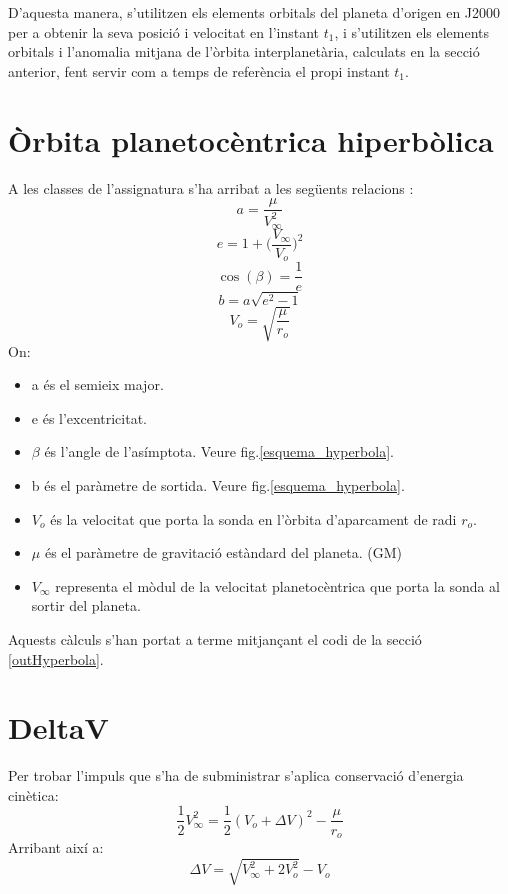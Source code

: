 D'aquesta manera, s'utilitzen els elements orbitals del planeta d'origen en J2000 per a obtenir la seva posició i velocitat en l'instant $t_1$, i s'utilitzen els elements orbitals i l'anomalia mitjana de l'òrbita interplanetària, calculats en la secció anterior, fent servir com a temps de referència el propi instant $t_1$.

\section{Òrbita planetocèntrica hiperbòlica}
A les classes de l'assignatura s'ha arribat a les següents relacions \cite{Calaf2017d}:
\begin{equation}
a = \frac{\mu}{V_{\infty}^{2}}
\end{equation}
\begin{equation}
e = 1 + \Big(\frac{V_{\infty}}{V_{o}}\Big)^2
\end{equation}
\begin{equation}
\cos(\beta) = \frac{1}{e}
\end{equation}
\begin{equation}
b = a\sqrt{e^2-1}
\end{equation}
\begin{equation}
V_o = \sqrt{\frac{\mu}{r_o}}
\end{equation}
On:
\begin{itemize}
	\item a és el semieix major.
	\item e és l'excentricitat.
	\item $\beta$ és l'angle de l'asímptota. Veure fig.\ref{esquema_hyperbola}.
	\item b és el paràmetre de sortida. Veure fig.\ref{esquema_hyperbola}.
	\item $V_o$ és la velocitat que porta la sonda en l'òrbita d'aparcament de radi $r_o$.
	\item $\mu$ és el paràmetre de gravitació estàndard del planeta. (GM)
	\item $V_{\infty}$ representa el mòdul de la velocitat planetocèntrica que porta la sonda al sortir del planeta.
\end{itemize}
Aquests càlculs s'han portat a terme mitjançant el codi de la secció \ref{outHyperbola}.
\section{DeltaV}
Per trobar l'impuls que s'ha de subministrar s'aplica conservació d'energia cinètica:
\begin{equation*}
\frac{1}{2}V_{\infty}^2 =\frac{1}{2}(V_o + \Delta V)^2 - \frac{\mu}{r_o}
\end{equation*}
Arribant així a:
\begin{equation}
\Delta V = \sqrt{V_{\infty}^2+2V_{o}^2} - V_o
\end{equation}

